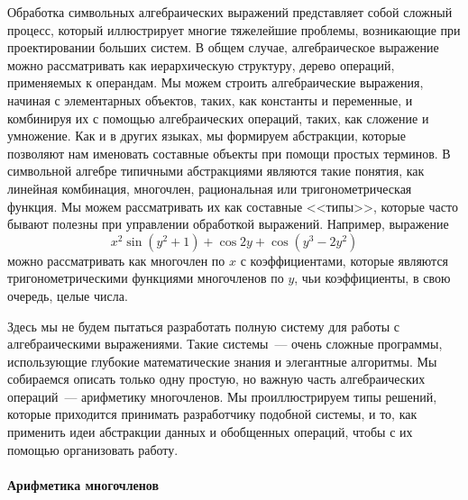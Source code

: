 Обработка символьных алгебраических выражений
представляет собой сло\-жный процесс, который иллюстрирует многие
тяжелейшие проблемы, возникающие при проектировании больших
систем. В общем случае, алгебраическое выражение 
можно рассматривать 
как иерархическую структуру, дерево операций, применяемых к
операндам.  Мы можем строить алгебраические выражения, начиная с
элементарных объектов, таких, как константы и переменные, и комбинируя
их с помощью алгебраических операций, таких, как сложение и умножение.
Как и в других языках, мы формируем абстракции, которые позволяют нам
именовать составные объекты при помощи простых терминов.  В символьной
алгебре типичными абстракциями являются такие понятия, как линейная
комбинация, многочлен, рациональная или тригонометрическая функция.  Мы
можем рассматривать их как составные <<типы>>, которые часто бывают
полезны при управлении обработкой выражений.  Например, выражение
$$
x^2 \sin (y^2+1) + \cos 2y + \cos (y^3-2y^2)
$$
можно рассматривать как многочлен по $x$ с
коэффициентами, которые являются тригонометрическими функциями
многочленов по $y$, чьи коэффициенты, в свою
очередь, целые числа.

Здесь мы не будем пытаться разработать полную систему для
работы с алгебраическими выражениями.  Такие системы~--- очень сложные
программы, использующие глубокие математические знания и элегантные
алгоритмы.  Мы собираемся описать только одну простую, но важную часть
алгебраических операций~--- арифметику многочленов.  Мы
проиллюстрируем типы решений, которые приходится принимать
разработчику подобной системы, и то, как применить идеи абстракции данных
и обобщенных операций, чтобы с их помощью организовать работу.

\paragraph{Арифметика многочленов}



